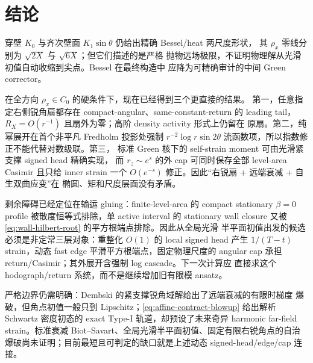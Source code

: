 \documentclass[11pt,a4paper,fontset=fandol]{ctexart}
\begin{document}
\section{结论}

穿壁 $K_0$ 与齐次壁面 $K_1\sin\theta$ 仍给出精确 Bessel/heat 两尺度形状，
其 $\rho_x$ 零线分别为 $\sqrt{2X}$ 与 $\sqrt{6X}$；但它们描述的是严格
抛物远场极限，不证明物理解从光滑初值自动收缩到尖点。Bessel 在最终构造中
应降为可精确审计的中间 Green corrector。

在全方向 $\rho_x\in C_0$ 的硬条件下，现在已经得到三个更直接的结果。
第一，任意指定右侧锐角扇都存在 compact-angular、same-constant-return 的
leading tail，$R_X=O(r^{-1})$ 且扇外为零；高阶 density activity 形式上仍留在
原扇。第二，纯幂展开在首个非平凡 Fredholm 投影处强制
$r^{-2}\log r\sin2\theta$ 流函数项，所以指数修正不能代替对数级联。第三，
标准 Green 核下的 self-strain moment 可由光滑紧支撑 signed head 精确实现，
而 $r_z\sim e^s$ 的外 cap 可同时保存全部 level-area Casimir 且只给 inner
strain 一个 $O(e^{-s})$ 修正。因此“右锐扇 + 远端衰减 + 自生双曲应变”在
椭圆、矩和尺度层面没有矛盾。

剩余障碍已经定位在输运 gluing：finite-level-area 的 compact stationary
$\beta=0$ profile 被散度恒等式排除，单 active interval 的 stationary wall
closure 又被 \eqref{eq:wall-hilbert-root} 的平方根端点排除。因此从全局光滑
半平面初值出发的候选必须是非定常三层对象：重整化 $O(1)$ 的 local signed
head 产生 $1/(T-t)$ strain，动态 fast edge 平滑平方根端点，固定物理尺度的
angular cap 承担 return/Casimir；其外展开含强制 log cascade。下一次计算应
直接求这个 hodograph/return 系统，而不是继续增加旧有限模 ansatz。

严格边界仍需明确：Dembski 的紧支撑锐角域解给出了远端衰减的有限时梯度
爆破，但角点初值一般只到 Lipschitz；\eqref{eq:affine-contract-blowup} 给出解析
Schwartz 密度初态的 exact Type-I 轨道，却预设了未来奇异 harmonic far-field
strain。标准衰减 Biot--Savart、全局光滑半平面初值、固定有限右锐角点的自治
爆破尚未证明；目前最短且可判定的缺口就是上述动态 signed-head/edge/cap
连接。
\end{document}
